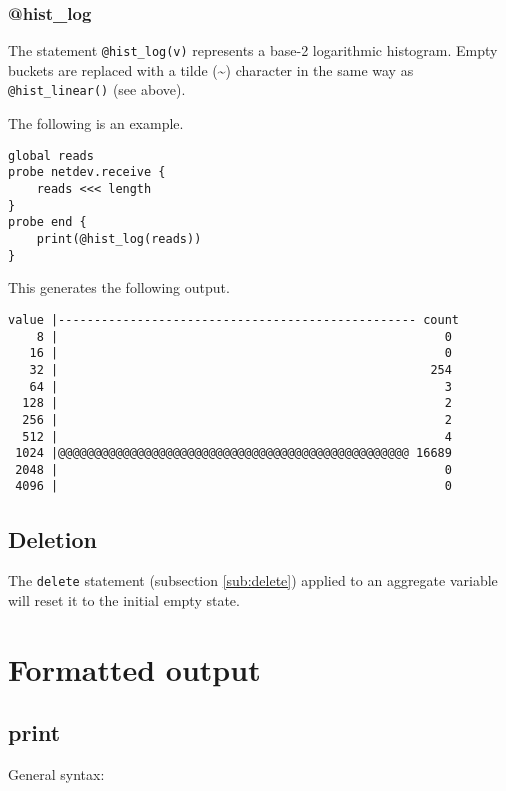 \documentclass[twoside,english]{article}
\newenvironment{vindent}
{\begin{list}{}{\setlength{\listparindent}{6pt}}
\item[]}
{\end{list}}
\begin{document}
\subsubsection{@hist\_log}
The statement \texttt{@hist\_log(v)} represents a base-2 logarithmic
histogram.  Empty buckets are replaced with a tilde (\textasciitilde{})
character in the same way as \texttt{@hist\_linear()} (see above).

The following is an example.

\begin{vindent}
\begin{verbatim}
global reads
probe netdev.receive {
    reads <<< length
}
probe end {
    print(@hist_log(reads))
}
\end{verbatim}
\end{vindent}
This generates the following output.

\begin{samepage}
\begin{vindent}
\begin{verbatim}
value |-------------------------------------------------- count
    8 |                                                      0
   16 |                                                      0
   32 |                                                    254
   64 |                                                      3
  128 |                                                      2
  256 |                                                      2
  512 |                                                      4
 1024 |@@@@@@@@@@@@@@@@@@@@@@@@@@@@@@@@@@@@@@@@@@@@@@@@@ 16689
 2048 |                                                      0
 4096 |                                                      0
\end{verbatim}
\end{vindent}
\end{samepage}

\subsection{Deletion}
The \texttt{delete} statement (subsection \ref{sub:delete}) applied to an
aggregate variable will reset it to the initial empty state.

\section{Formatted output}

\subsection{print}
General syntax:
\end{document}
